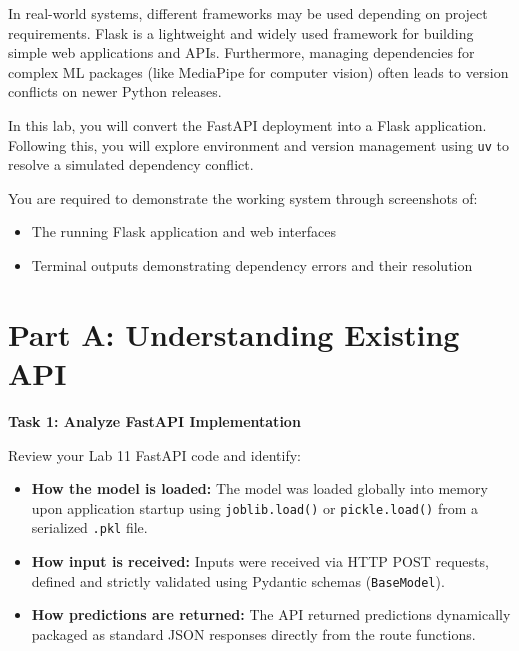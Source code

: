 \documentclass[12pt,a4paper]{article}
\begin{document}
In real-world systems, different frameworks may be used depending on project requirements. Flask is a lightweight and widely used framework for building simple web applications and APIs. Furthermore, managing dependencies for complex ML packages (like MediaPipe for computer vision) often leads to version conflicts on newer Python releases.

In this lab, you will convert the FastAPI deployment into a Flask application. Following this, you will explore environment and version management using \texttt{uv} to resolve a simulated dependency conflict.

You are required to demonstrate the working system through screenshots of:
\begin{itemize}
\item The running Flask application and web interfaces
\item Terminal outputs demonstrating dependency errors and their resolution
\end{itemize}


\section*{Part A: Understanding Existing API}

\begin{tcolorbox}
\textbf{Task 1: Analyze FastAPI Implementation}

Review your Lab 11 FastAPI code and identify:
\begin{itemize}
\item \textbf{How the model is loaded:} The model was loaded globally into memory upon application startup using \texttt{joblib.load()} or \texttt{pickle.load()} from a serialized \texttt{.pkl} file.
\item \textbf{How input is received:} Inputs were received via HTTP POST requests, defined and strictly validated using Pydantic schemas (\texttt{BaseModel}).
\item \textbf{How predictions are returned:} The API returned predictions dynamically packaged as standard JSON responses directly from the route functions.
\end{itemize}

\end{tcolorbox}

\end{document}
